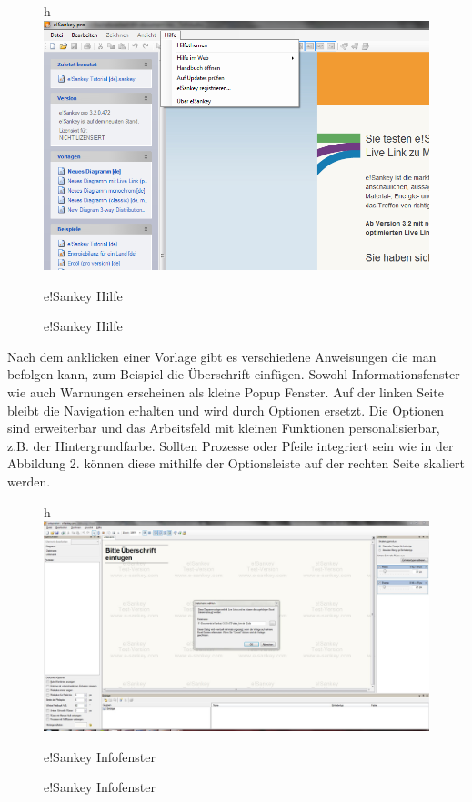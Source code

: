 \documentclass[a4paper, 12pt, twoside, BCOR=20mm, DIV=calc, abstracton, parskip=half*, toc=bibliography, toc=listof, headsepline, footsepline, headings=small, numbers=enddot]{scrreprt}
\begin{document}
\begin{figure}{h}
\centering
\includegraphics[width=\textwidth]{Bild/esankey Hilfe.png}
\caption{e!Sankey Hilfe}{e!Sankey Hilfe}
\end{figure}	
Nach dem anklicken einer Vorlage gibt es verschiedene Anweisungen die man befolgen kann, zum Beispiel die Überschrift einfügen. Sowohl Informationsfenster wie auch Warnungen erscheinen als kleine Popup Fenster. Auf der linken Seite bleibt die Navigation erhalten und wird durch Optionen ersetzt. Die Optionen sind erweiterbar und das Arbeitsfeld mit kleinen Funktionen personalisierbar, z.B. der Hintergrundfarbe. Sollten Prozesse oder Pfeile integriert sein wie in der Abbildung 2. können diese mithilfe der Optionsleiste auf der rechten Seite skaliert werden. 
\begin{figure}{h}
\centering
\includegraphics[width=\textwidth]{Bild/esankey Handlung und Infofenster.JPG}
\caption{e!Sankey Infofenster}{e!Sankey Infofenster}
\end{figure}	
\end{document}
